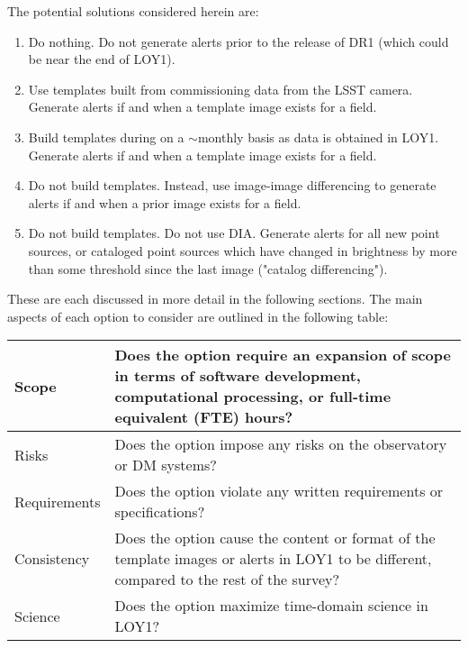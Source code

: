 \documentclass[DM,lsstdraft,toc]{lsstdoc}
\begin{document}
The potential solutions considered herein are:
\begin{enumerate}
\item Do nothing. Do not generate alerts prior to the release of DR1 (which could be near the end of LOY1).
\item Use templates built from commissioning data from the LSST camera. Generate alerts if and when a template image exists for a field. 
\item Build templates during on a $\sim$monthly basis as data is obtained in LOY1. Generate alerts if and when a template image exists for a field.
\item Do not build templates. Instead, use image-image differencing to generate alerts if and when a prior image exists for a field.
\item Do not build templates. Do not use DIA. Generate alerts for all new point sources, or cataloged point sources which have changed in brightness by more than some threshold since the last image ("catalog differencing").
\end{enumerate}

These are each discussed in more detail in the following sections. The main aspects of each option to consider are outlined in the following table:
\begin{center}
\begin{tabular}{|p{2.5cm}|p{13cm}|}
\hline
Scope & Does the option require an expansion of scope in terms of software development, computational processing, or full-time equivalent (FTE) hours? \\
\hline
Risks & Does the option impose any risks on the observatory or DM systems?  \\
\hline
Requirements & Does the option violate any written requirements or specifications? \\
\hline
Consistency & Does the option cause the content or format of the template images or alerts in LOY1 to be different, compared to the rest of the survey? \\ %
\hline
Science & Does the option maximize time-domain science in LOY1? \\
\hline
\end{tabular}
\end{center} 
\end{document}
